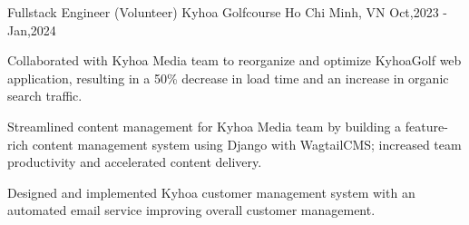 \cventry
{Fullstack Engineer (Volunteer)} %
{Kyhoa Golfcourse \href{https://kyhoa-1e92f6cd9b25.herokuapp.com/}{\faExternalLink*}} %
{Ho Chi Minh, VN} 
{Oct,2023 - Jan,2024} %
{
  \begin{cvitems}
    \item {Collaborated with Kyhoa Media team to reorganize and optimize KyhoaGolf web application, resulting in a 50\% decrease in load time and an increase in organic search traffic.}
    \item {Streamlined content management for Kyhoa Media team by building a feature-rich content management system using Django with WagtailCMS; increased team productivity and accelerated content delivery.}
    \item {Designed and implemented Kyhoa customer management system with an automated email service improving overall customer management.}
  \end{cvitems}
}
